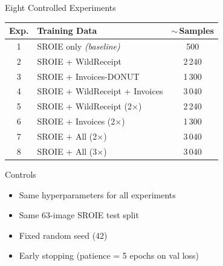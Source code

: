 \documentclass[aspectratio=169,11pt]{beamer}
\begin{document}
\begin{frame}{Eight Controlled Experiments}
  \centering
  \begin{tabular}{@{}clc@{}}
    \toprule
    \textbf{Exp.} & \textbf{Training Data} &
    \textbf{$\sim$\,Samples} \\
    \midrule
    1 & SROIE only \textit{(baseline)} & 500 \\
    2 & SROIE + WildReceipt            & 2\,240 \\
    3 & SROIE + Invoices-DONUT         & 1\,300 \\
    4 & SROIE + WildReceipt + Invoices & 3\,040 \\
    5 & SROIE + WildReceipt (2$\times$)& 2\,240 \\
    6 & SROIE + Invoices (2$\times$)   & 1\,300 \\
    7 & SROIE + All (2$\times$)        & 3\,040 \\
    8 & SROIE + All (3$\times$)        & 3\,040 \\
    \bottomrule
  \end{tabular}

  \vspace{0.4cm}

  \begin{block}{Controls}
    \begin{itemize}
      \item Same hyperparameters for all experiments
      \item Same 63-image SROIE test split
      \item Fixed random seed (42)
      \item Early stopping (patience = 5 epochs on val loss)
    \end{itemize}
  \end{block}
\end{frame}
\end{document}
